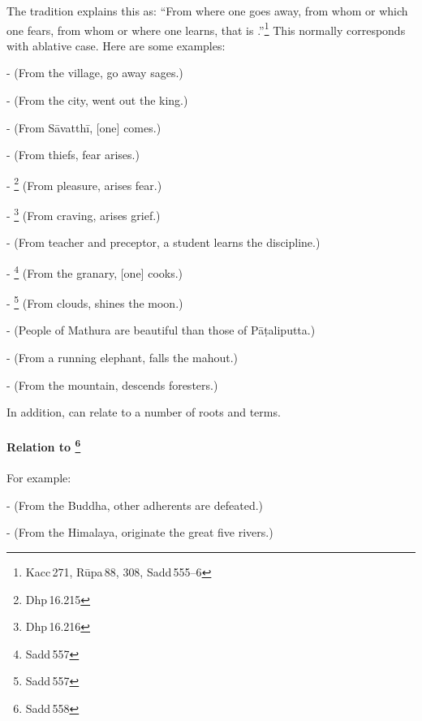 The tradition explains this as: ``From where one goes away, from whom or which one fears, from whom or where one learns, that is .''\footnote{Kacc\,271, R\=upa\,88, 308, Sadd\,555--6} This normally corresponds with ablative case. Here are some examples:\par
-  (From the village, go away sages.)\par
-  (From the city, went out the king.)\par
-  (From S\=avatth\=i, [one] comes.)\par
-  (From thiefs, fear arises.)\par
- \footnote{Dhp\,16.215} (From pleasure, arises fear.)\par
- \footnote{Dhp\,16.216} (From craving, arises grief.)\par
-  (From teacher and preceptor, a student learns the discipline.)\par
- \footnote{Sadd\,557} (From the granary, [one] cooks.)\par
- \footnote{Sadd\,557} (From clouds, shines the moon.)\par
-  (People of Mathura are beautiful than those of P\=a\d taliputta.)\par
-  (From a running elephant, falls the mahout.)\par
-  (From the mountain, descends foresters.)\par

\bigskip
In addition,  can relate to a number of roots and terms.

\paragraph*{Relation to \footnote{Sadd\,558}} For example:\par
-  (From the Buddha, other adherents are defeated.)\par
-  (From the Himalaya, originate the great five rivers.)\par

